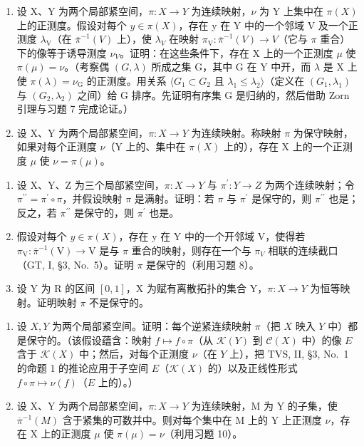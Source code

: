 \begin{enumerate}
\def\labelenumi{\arabic{enumi})}
\setcounter{enumi}{7}
\item
  设 X、Y 为两个局部紧空间，\(\pi: X \to Y\) 为连续映射，\(\nu\) 为 Y 上集中在 \(\pi(X)\) 上的正测度。假设对每个 \(y \in \pi(X)\)，存在 y 在 Y 中的一个邻域 V 及一个正测度 \(\lambda_{\mathrm{V}}\)（在 \(\overline{\pi}^{-1}(V)\) 上），使 \(\lambda_{V}\) 在映射 \(\pi_{\mathrm{V}}: \overline{\pi}^{-1}(V) \to V\)（它与 \(\pi\) 重合）下的像等于诱导测度 \(\nu_{V}\)。证明：在这些条件下，存在 X 上的一个正测度 \(\mu\) 使 \(\pi(\mu) = \nu\)。（考察偶 \((G, \lambda)\) 所成之集 G，其中 G 在 Y 中开，而 \(\lambda\) 是 X 上使 \(\pi(\lambda) = \nu_{\mathrm{G}}\) 的正测度。用关系 \(\langle G_{1} \subset G_{2} \text{ 且 } \lambda_{1} \leqslant \lambda_{2} \rangle\)（定义在 \((G_{1}, \lambda_{1})\) 与 \((G_{2}, \lambda_{2})\) 之间）给 G 排序。先证明有序集 G 是归纳的，然后借助 Zorn 引理与习题 7 完成论证。）
\item
  设 X、Y 为两个局部紧空间，\(\pi: X \to Y\) 为连续映射。称映射 \(\pi\) 为保守映射，如果对每个正测度 \(\nu\)（Y 上的、集中在 \(\pi(X)\) 上的），存在 X 上的一个正测度 \(\mu\) 使 \(\nu = \pi(\mu)\)。
\end{enumerate}

\begin{enumerate}
\def\labelenumi{\alph{enumi})}
\item
  设 X、Y、Z 为三个局部紧空间，\(\pi:X\to Y\) 与 \(\pi^{\prime}:Y\to Z\) 为两个连续映射；令 \(\pi^{\prime\prime}=\pi^{\prime}\circ\pi\)，并假设映射 \(\pi\) 是满射。证明：若 \(\pi\) 与 \(\pi^{\prime}\) 是保守的，则 \(\pi^{\prime\prime}\) 也是；反之，若 \(\pi^{\prime\prime}\) 是保守的，则 \(\pi^{\prime}\) 也是。
\item
  假设对每个 \(y \in \pi(X)\)，存在 y 在 Y 中的一个开邻域 V，使得若 \(\pi_{\mathrm{V}} : \overline{\pi}^{-1}(\mathrm{V}) \to \mathrm{V}\) 是与 \(\pi\) 重合的映射，则存在一个与 \(\pi_{V}\) 相联的连续截口（GT, I, §3, No.~5）。证明 \(\pi\) 是保守的（利用习题 8）。
\item
  设 Y 为 R 的区间 \([0,1]\)，X 为赋有离散拓扑的集合 Y，\(\pi:X\to Y\) 为恒等映射。证明映射 \(\pi\) 不是保守的。
\end{enumerate}

\begin{enumerate}
\def\labelenumi{\arabic{enumi})}
\setcounter{enumi}{9}
\item
  设 \(X, Y\) 为两个局部紧空间。证明：每个逆紧连续映射 \(\pi\)（把 \(X\) 映入 \(Y\) 中）都是保守的。（该假设蕴含：映射 \(f \mapsto f \circ \pi\)（从 \(\mathcal{K}(Y)\) 到 \(\mathcal{C}(X)\) 中）的像 \(E\) 含于 \(\mathcal{K}(X)\) 中；然后，对每个正测度 \(\nu\)（在 \(Y\) 上），把 TVS, II, §3, No.~1 的命题 1 的推论应用于子空间 \(E\)（\(\mathcal{K}(X)\) 的）以及正线性形式 \(f \circ \pi \mapsto \nu(f)\)（\(E\) 上的）。）
\item
  设 X、Y 为两个局部紧空间，\(\pi: X \to Y\) 为连续映射，M 为 Y 的子集，使 \(\overline{\pi}^{-1}(M)\) 含于紧集的可数并中。则对每个集中在 M 上的 Y 上正测度 \(\nu\)，存在 X 上的正测度 \(\mu\) 使 \(\pi(\mu) = \nu\)（利用习题 10）。
\end{enumerate}
\relax{}
\setcounter{exercisegroup}{8}
\edef\CurrentExerciseGroup{\arabic{exercisegroup}}
